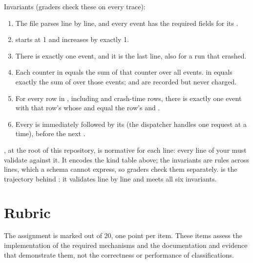 \documentclass[9pt,letterpaper]{article}
\begin{document}
Invariants (graders check these on every trace):
\begin{enumerate}
\item The file parses line by line, and every event has the required fields for
  its .
\item {} starts at 1 and increases by exactly 1.
\item There is exactly one  event, and it is the last line, also
  for a run that crashed.
\item Each counter in  equals the sum of that counter over all
   events.  in 
  equals exactly the sum of  over those events;
   and  are recorded but never charged.
\item For every row in , including  and
  crash-time  rows, there is exactly one\linebreak{}  event
  with that row's  whose  and 
  equal the row's  and .
\item Every  is immediately followed by its 
  (the dispatcher handles one request at a time), before the next
  .
\end{enumerate}

, at the root of this repository, is normative for each
line: every line of your  must validate against it. It encodes
the kind table above; the invariants are rules across lines, which a schema
cannot express, so graders check them separately. 
is the trajectory behind : it validates line by
line and meets all six invariants.


\section{Rubric}\label{sec:rubric}

The assignment is marked out of 20, one point per item. These items assess the
implementation of the required mechanisms and the documentation and evidence
that demonstrate them, not the correctness or performance of classifications.
\end{document}

